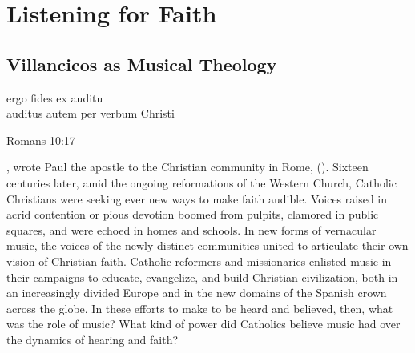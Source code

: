 % 

\part{Listening for Faith}
\label{part:faith}

\chapter{Villancicos as Musical Theology}
\label{ch:intro}

\epigraph
{ergo fides ex auditu\\
auditus autem per verbum Christi}
{Romans 10:17}

, wrote Paul the apostle to the Christian
community in Rome, 
().
Sixteen centuries later, amid the ongoing reformations of the Western Church,
Catholic Christians were seeking ever new ways to make faith audible.
Voices raised in acrid contention or pious devotion boomed from pulpits,
clamored in public squares, and were echoed in homes and schools.  
In new forms of vernacular music, the voices of the newly distinct communities
united to articulate their own vision of Christian faith.
Catholic reformers and missionaries enlisted music in their campaigns to
educate, evangelize, and build Christian civilization, both in an increasingly
divided Europe and in the new domains of the Spanish crown across the globe.
In these efforts to make  to be heard and believed,
then, what was the role of music?
What kind of power did Catholics believe music had over the dynamics of hearing
and faith?

